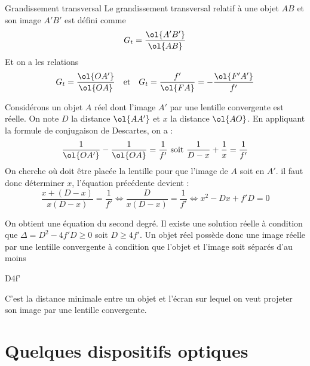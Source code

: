 \documentclass{cours}
\begin{document}
\begin{loi}{Grandissement transversal}
  Le grandissement transversal relatif à une objet $AB$ et son image $A'B'$ est défini comme
\begin{equation}
  G_t=\frac{\ol{A'B'}}{\ol{AB}}
\end{equation}
Et on a les relations
\begin{equation}
  G_t = \frac{\ol{OA'}}{\ol{OA}}  \quad \text{et}\quad G_t= \frac{f'}{\ol{FA}} = -\frac{\ol{F'A'}}{f'}
\end{equation}
\end{loi}

Considérons un objet $A$ réel dont l'image $A'$ par une lentille convergente est réelle. On note $D$ la distance $\ol{AA'}$ et $x$ la distance $\ol{AO}$. En appliquant la formule de conjugaison de Descartes, on a :
\begin{equation*}
  \frac{1}{\ol{OA'}}-\frac{1}{\ol{OA}} = \frac{1}{f'} \text{ soit } \frac{1}{D-x} + \frac{1}{x} = \frac{1}{f'}
\end{equation*}
On cherche où doit être placée la lentille pour que l'image de $A$ soit en $A'$. il faut donc déterminer $x$, l'équation précédente devient :
\begin{equation*}
  \frac{x+(D-x)}{x(D-x)} = \frac{1}{f'} \Leftrightarrow \frac{D}{x(D-x)} = \frac{1}{f'} \Leftrightarrow x^2-Dx+f'D = 0
\end{equation*}

On obtient une équation du second degré. Il existe une solution réelle à condition que $\Delta = D^2-4f'D \geq 0$ soit $D\geq 4f'$. Un objet réel possède donc une image réelle par une lentille convergente à condition que l'objet et l'image soit séparés d'au moins 
\begin{eqencadre}
  D\geq 4f'
\end{eqencadre}
C'est la distance minimale entre un objet et l'écran sur lequel on veut projeter son image par une lentille convergente. 

\section{Quelques dispositifs optiques}
\end{document}
